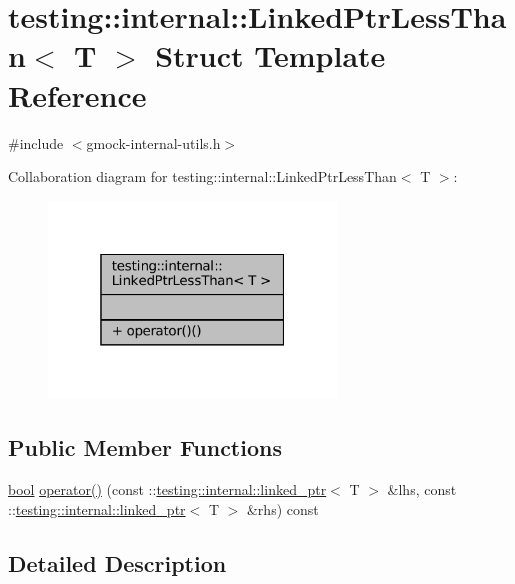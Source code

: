 \hypertarget{structtesting_1_1internal_1_1LinkedPtrLessThan}{}\section{testing\+:\+:internal\+:\+:Linked\+Ptr\+Less\+Than$<$ T $>$ Struct Template Reference}
\label{structtesting_1_1internal_1_1LinkedPtrLessThan}


{\ttfamily \#include $<$gmock-\/internal-\/utils.\+h$>$}



Collaboration diagram for testing\+:\+:internal\+:\+:Linked\+Ptr\+Less\+Than$<$ T $>$\+:
\nopagebreak
\begin{figure}[H]
\begin{center}
\leavevmode
\includegraphics[width=217pt]{structtesting_1_1internal_1_1LinkedPtrLessThan__coll__graph}
\end{center}
\end{figure}
\subsection*{Public Member Functions}
\begin{DoxyCompactItemize}
\item 
\hyperlink{classbool}{bool} \hyperlink{structtesting_1_1internal_1_1LinkedPtrLessThan_a0614293c43e51b280a870ab117355164}{operator()} (const \+::\hyperlink{classtesting_1_1internal_1_1linked__ptr}{testing\+::internal\+::linked\+\_\+ptr}$<$ T $>$ \&lhs, const \+::\hyperlink{classtesting_1_1internal_1_1linked__ptr}{testing\+::internal\+::linked\+\_\+ptr}$<$ T $>$ \&rhs) const
\end{DoxyCompactItemize}


\subsection{Detailed Description}
